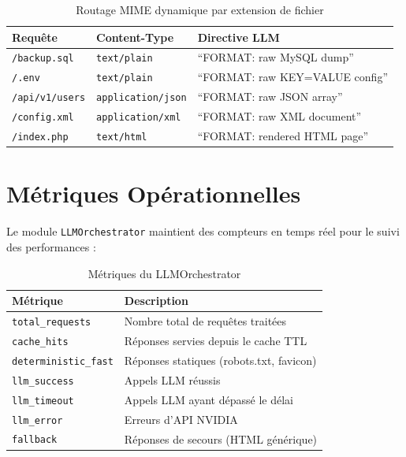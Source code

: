\documentclass[12pt,a4paper]{article}
\begin{document}
\begin{table}[h!]
\centering
\begin{tabular}{l l l}
\toprule
\textbf{Requête} & \textbf{Content-Type} & \textbf{Directive LLM} \\
\midrule
\texttt{/backup.sql} & \texttt{text/plain} & ``FORMAT: raw MySQL dump'' \\
\texttt{/.env} & \texttt{text/plain} & ``FORMAT: raw KEY=VALUE config'' \\
\texttt{/api/v1/users} & \texttt{application/json} & ``FORMAT: raw JSON array'' \\
\texttt{/config.xml} & \texttt{application/xml} & ``FORMAT: raw XML document'' \\
\texttt{/index.php} & \texttt{text/html} & ``FORMAT: rendered HTML page'' \\
\bottomrule
\end{tabular}
\caption{Routage MIME dynamique par extension de fichier}
\end{table}

\section{Métriques Opérationnelles}

Le module \texttt{LLMOrchestrator} maintient des compteurs en temps réel pour le suivi des performances :

\begin{table}[h!]
\centering
\begin{tabular}{l l}
\toprule
\textbf{Métrique} & \textbf{Description} \\
\midrule
\texttt{total\_requests} & Nombre total de requêtes traitées \\
\texttt{cache\_hits} & Réponses servies depuis le cache TTL \\
\texttt{deterministic\_fast} & Réponses statiques (robots.txt, favicon) \\
\texttt{llm\_success} & Appels LLM réussis \\
\texttt{llm\_timeout} & Appels LLM ayant dépassé le délai \\
\texttt{llm\_error} & Erreurs d'API NVIDIA \\
\texttt{fallback} & Réponses de secours (HTML générique) \\
\bottomrule
\end{tabular}
\caption{Métriques du LLMOrchestrator}
\end{table}
\end{document}
